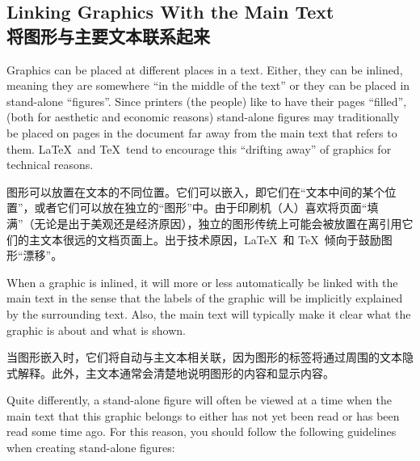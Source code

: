 \subsection{Linking Graphics With the Main Text\\将图形与主要文本联系起来}

Graphics can be placed at different places in a text. Either, they can be
inlined, meaning they are somewhere ``in the middle of the text'' or they can
be placed in stand-alone ``figures''. Since printers (the people) like to have
their pages ``filled'', (both for aesthetic and economic reasons) stand-alone
figures may traditionally be placed on pages in the document far away from the
main text that refers to them. \LaTeX\ and \TeX\ tend to encourage this
``drifting away'' of graphics for technical reasons.

图形可以放置在文本的不同位置。它们可以嵌入，即它们在“文本中间的某个位置”，或者它们可以放在独立的“图形”中。由于印刷机（人）喜欢将页面“填满”（无论是出于美观还是经济原因），独立的图形传统上可能会被放置在离引用它们的主文本很远的文档页面上。出于技术原因，\LaTeX\ 和 \TeX\ 倾向于鼓励图形“漂移”。

When a graphic is inlined, it will more or less automatically be linked with
the main text in the sense that the labels of the graphic will be implicitly
explained by the surrounding text. Also, the main text will typically make it
clear what the graphic is about and what is shown.

当图形嵌入时，它们将自动与主文本相关联，因为图形的标签将通过周围的文本隐式解释。此外，主文本通常会清楚地说明图形的内容和显示内容。

Quite differently, a stand-alone figure will often be viewed at a time when the
main text that this graphic belongs to either has not yet been read or has been
read some time ago. For this reason, you should follow the following guidelines
when creating stand-alone figures:

